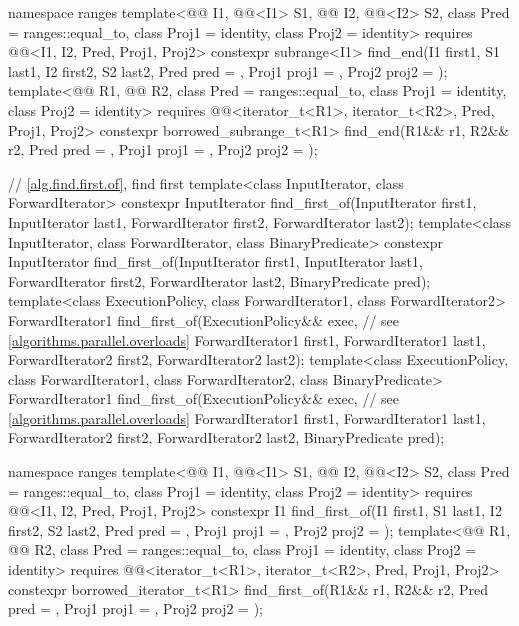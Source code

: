 \begin{codeblock}
{  namespace ranges {
    template<@@ I1, @@<I1> S1, @@ I2, @@<I2> S2,
             class Pred = ranges::equal_to, class Proj1 = identity, class Proj2 = identity>
      requires @@<I1, I2, Pred, Proj1, Proj2>
      constexpr subrange<I1>
        find_end(I1 first1, S1 last1, I2 first2, S2 last2, Pred pred = {},
                 Proj1 proj1 = {}, Proj2 proj2 = {});
    template<@@ R1, @@ R2,
             class Pred = ranges::equal_to, class Proj1 = identity, class Proj2 = identity>
      requires @@<iterator_t<R1>, iterator_t<R2>, Pred, Proj1, Proj2>
      constexpr borrowed_subrange_t<R1>
        find_end(R1&& r1, R2&& r2, Pred pred = {},
                 Proj1 proj1 = {}, Proj2 proj2 = {});
  }

  // \ref{alg.find.first.of}, find first
  template<class InputIterator, class ForwardIterator>
    constexpr InputIterator
      find_first_of(InputIterator first1, InputIterator last1,
                    ForwardIterator first2, ForwardIterator last2);
  template<class InputIterator, class ForwardIterator, class BinaryPredicate>
    constexpr InputIterator
      find_first_of(InputIterator first1, InputIterator last1,
                    ForwardIterator first2, ForwardIterator last2,
                    BinaryPredicate pred);
  template<class ExecutionPolicy, class ForwardIterator1, class ForwardIterator2>
    ForwardIterator1
      find_first_of(ExecutionPolicy&& exec,                     // see \ref{algorithms.parallel.overloads}
                    ForwardIterator1 first1, ForwardIterator1 last1,
                    ForwardIterator2 first2, ForwardIterator2 last2);
  template<class ExecutionPolicy, class ForwardIterator1,
           class ForwardIterator2, class BinaryPredicate>
    ForwardIterator1
      find_first_of(ExecutionPolicy&& exec,                     // see \ref{algorithms.parallel.overloads}
                    ForwardIterator1 first1, ForwardIterator1 last1,
                    ForwardIterator2 first2, ForwardIterator2 last2,
                    BinaryPredicate pred);

  namespace ranges {
    template<@@ I1, @@<I1> S1, @@ I2, @@<I2> S2,
             class Pred = ranges::equal_to, class Proj1 = identity, class Proj2 = identity>
      requires @@<I1, I2, Pred, Proj1, Proj2>
      constexpr I1 find_first_of(I1 first1, S1 last1, I2 first2, S2 last2, Pred pred = {},
                                 Proj1 proj1 = {}, Proj2 proj2 = {});
    template<@@ R1, @@ R2,
             class Pred = ranges::equal_to, class Proj1 = identity, class Proj2 = identity>
      requires @@<iterator_t<R1>, iterator_t<R2>, Pred, Proj1, Proj2>
      constexpr borrowed_iterator_t<R1>
        find_first_of(R1&& r1, R2&& r2, Pred pred = {},
                      Proj1 proj1 = {}, Proj2 proj2 = {});
  }

}
\end{codeblock}
